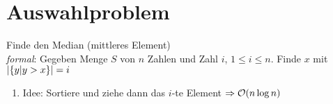     \section{Auswahlproblem} 
        Finde den Median (mittleres Element) \\
        \emph{formal}: Gegeben Menge $S$ von $n$ Zahlen und Zahl $i$, $1 \leq i \leq n$. Finde $x$ mit $\left| \{ y | y> x \} \right| = i$
       
        \begin{enumerate}[1.]
            \item Idee: Sortiere und ziehe dann das $i$-te Element $\Ra \LO(n \log n)$

        \end{enumerate}
 
